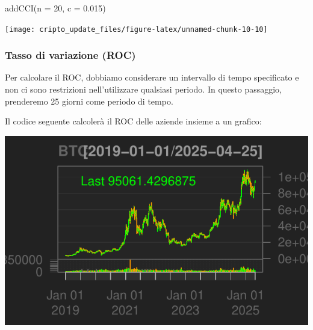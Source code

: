 \documentclass[]{tufte-handout}
\newenvironment{Shaded}{}{}
\newcommand{\AttributeTok}[1]{\textcolor[rgb]{0.49,0.56,0.16}{#1}}
\newcommand{\CommentTok}[1]{\textcolor[rgb]{0.38,0.63,0.69}{\textit{#1}}}
\newcommand{\DecValTok}[1]{\textcolor[rgb]{0.25,0.63,0.44}{#1}}
\newcommand{\FloatTok}[1]{\textcolor[rgb]{0.25,0.63,0.44}{#1}}
\newcommand{\FunctionTok}[1]{\textcolor[rgb]{0.02,0.16,0.49}{#1}}
\newcommand{\NormalTok}[1]{#1}
\newcommand{\OtherTok}[1]{\textcolor[rgb]{0.00,0.44,0.13}{#1}}
\newcommand{\SpecialCharTok}[1]{\textcolor[rgb]{0.25,0.44,0.63}{#1}}
\newcommand{\StringTok}[1]{\textcolor[rgb]{0.25,0.44,0.63}{#1}}
\begin{document}
\begin{Shaded}
\begin{Highlighting}[]
\FunctionTok{addCCI}\NormalTok{(}\AttributeTok{n =} \DecValTok{20}\NormalTok{, }\AttributeTok{c =} \FloatTok{0.015}\NormalTok{)}
\end{Highlighting}
\end{Shaded}

\texttt{[image: cripto\_update\_files/figure-latex/unnamed-chunk-10-10]}

\subsubsection{Tasso di variazione (ROC)}\label{tasso-di-variazione-roc}

Per calcolare il ROC, dobbiamo considerare un intervallo di tempo
specificato e non ci sono restrizioni nell'utilizzare qualsiasi periodo.
In questo passaggio, prenderemo 25 giorni come periodo di tempo.

Il codice seguente calcolerà il ROC delle aziende insieme a un grafico:

\begin{Shaded}
\end{Shaded}

\includegraphics{cripto_update_files/figure-latex/unnamed-chunk-11-1}
\end{document}
